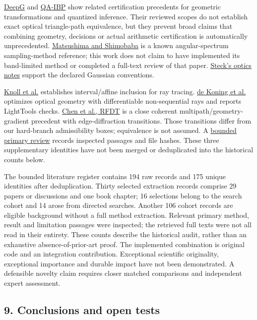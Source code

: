 \documentclass[
  10pt,
]{article}
\begin{document}
\href{https://ggndpsngh.github.io/files/neurips19-deepg.pdf}{DeepG} and
\href{https://ojs.aaai.org/index.php/AAAI/article/view/26747}{QA-IBP}
show related certification precedents for geometric transformations and
quantized inference. Their reviewed scopes do not establish exact
optical triangle-path equivalence, but they prevent broad claims that
combining geometry, decisions or actual arithmetic certification is
automatically unprecedented.
\href{https://doi.org/10.1364/OE.17.019662}{Matsushima and Shimobaba} is
a known angular-spectrum sampling-method reference; this work does not
claim to have implemented its band-limited method or completed a
full-text review of that paper.
\href{https://atomoptics.uoregon.edu/~dsteck/teaching/optics/optics-notes.pdf}{Steck's
optics notes} support the declared Gaussian conventions.

\href{https://www.sci.utah.edu/~knolla/cgrtia.pdf}{Knoll et al.}
establishes interval/affine inclusion for ray tracing.
\href{https://arxiv.org/abs/2302.12031}{de Koning et al.} optimizes
optical geometry with differentiable non-sequential rays and reports
LightTools checks. \href{https://arxiv.org/abs/2603.18026v1}{Chen et
al., RFDT} is a close coherent multipath/geometry-gradient precedent
with edge-diffraction transitions. Those transitions differ from our
hard-branch admissibility boxes; equivalence is not assumed. A
\href{../GEOMETRY_COHERENT_CERTIFICATION_PRIORS_2026-10-09.md}{bounded
primary review} records inspected passages and file hashes. These three
supplementary identities have not been merged or deduplicated into the
historical counts below.

The bounded literature register contains 194 raw records and 175 unique
identities after deduplication. Thirty selected extraction records
comprise 29 papers or discussions and one book chapter; 16 selections
belong to the search cohort and 14 arose from directed searches. Another
106 cohort records are eligible background without a full method
extraction. Relevant primary method, result and limitation passages were
inspected; the retrieved full texts were not all read in their entirety.
These counts describe the historical audit, rather than an exhaustive
absence-of-prior-art proof. The implemented combination is original code
and an integration contribution. Exceptional scientific originality,
exceptional importance and durable impact have not been demonstrated. A
defensible novelty claim requires closer matched comparisons and
independent expert assessment.

\hypertarget{conclusions-and-open-tests}{%
\subsection{9. Conclusions and open
tests}\label{conclusions-and-open-tests}}
\end{document}
